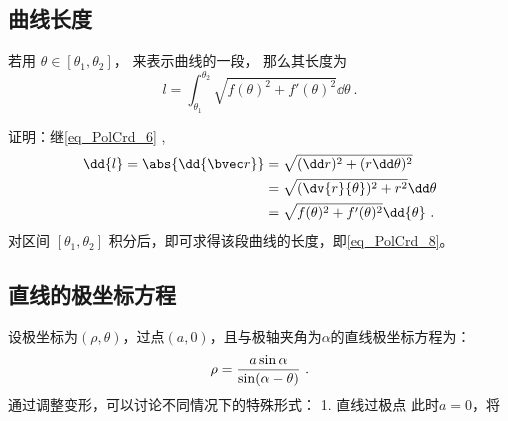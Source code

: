 \subsection{曲线长度}

若用 $\theta \in [\theta_1, \theta_2]$， 来表示曲线的一段， 那么其长度为
\begin{equation}\label{eq_PolCrd_8}
l = \int_{\theta_1}^{\theta_2} \sqrt{f(\theta)^2 + f'(\theta)^2} \dd{\theta}~.
\end{equation}

证明：继\autoref{eq_PolCrd_6} ,
\begin{align}
\dd{l} = \abs{\dd{\bvec r}} &=\sqrt{(\dd r)^2 + (r \dd \theta)^2} \\
&=\sqrt{(\dv {r}{\theta} )^2 + r^2} \dd \theta \\
&=\sqrt{f(\theta)^2 + f'(\theta)^2} \dd{\theta}~.
\end{align}
对区间 $[\theta_1,\theta_2]$ 积分后，即可求得该段曲线的长度，即\autoref{eq_PolCrd_8}。

\subsection{直线的极坐标方程}

设极坐标为$(\rho,\theta)$，过点$(a,0)$，且与极轴夹角为$\alpha$的直线极坐标方程为：
\begin{equation}
\rho={a\sin\alpha\over\sin(\alpha-\theta)}~.
\end{equation}
通过调整变形，可以讨论不同情况下的特殊形式：
1. 直线过极点
此时$a=0$，将